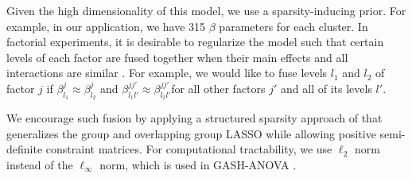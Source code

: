 Given the high dimensionality of this model, we use a
sparsity-inducing prior.  For example, in our application, we have 315
$\beta$ parameters for each cluster.  In factorial experiments, it is
desirable to regularize the model such that certain levels of each
factor are fused together when their main effects and all interactions
are similar \citep{post2013factor,egam:imai:19}.  For example, we
would like to fuse levels $l_1$ and $l_2$ of factor $j$ if
$\beta^j_{l_1} \approx \beta^j_{l_2}$ and
$\beta^{jj'}_{l_1 l'} \approx \beta^{jj'}_{l_2 l'} $for all other
factors $j'$ and all of its levels $l'$.

We encourage such fusion by applying a structured sparsity approach of
\citet{goplerud2021sparsity} that generalizes the group and
overlapping group LASSO
\citep[e.g.,][]{yuan:lin:06,yan2017hierarchical} while allowing
positive semi-definite constraint matrices.  For computational
tractability, we use $\ell_2$ norm instead of the $\ell_\infty$ norm,
which is used in GASH-ANOVA \citep{post2013factor}.

